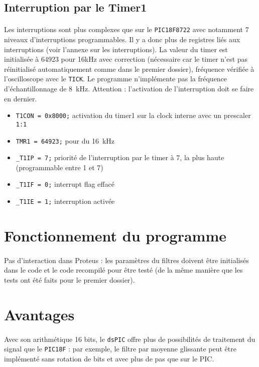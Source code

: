 \documentclass{article}
\begin{document}
    \subsection{Interruption par le Timer1}
    \paragraph{}
    Les interruptions sont plus complexes que sur le \texttt{PIC18F8722} avec notamment 7 niveaux d'interruptions programmables. Il y a donc plus de registres liés aux interruptions (voir l'annexe sur les interruptions). La valeur du timer est initialisée à 64923 pour 16kHz avec correction (nécessaire car le timer n'est pas réinitialisé automatiquement comme dans le premier dossier), fréquence vérifiée à l'oscilloscope avec le \texttt{TICK}. Le programme n'implémente pas la fréquence d'échantillonnage de \SI{8}{\kilo\hertz}. Attention : l'activation de l'interruption doit se faire en dernier.

    \begin{itemize}
        \item \texttt{T1CON = 0x8000;} activation du timer1 sur la clock interne avec un prescaler \texttt{1:1}
        \item \texttt{TMR1 = 64923;} pour du \SI{16}{\kilo\hertz}
        \item \texttt{\_T1IP = 7;} priorité de l'interruption par le timer à 7, la plus haute (programmable entre 1 et 7)
        \item \texttt{\_T1IF = 0;} interrupt flag effacé
        \item \texttt{\_T1IE = 1;} interruption activée
    \end{itemize}



\section{Fonctionnement du programme}
\paragraph{}
Pas d'interaction dans Proteus : les paramètres du filtres doivent être initialisés dans le code et le code recompilé pour être testé (de la même manière que les tests ont été faits pour le premier dossier).

\section{Avantages}
\paragraph{}
Avec son arithmétique 16 bits, le \texttt{dsPIC} offre plus de possibilités de traitement du signal que le \texttt{PIC18F} : par exemple, le filtre par moyenne glissante peut être implémenté sans rotation de bits et avec plus de pas que sur le PIC.
\end{document}
